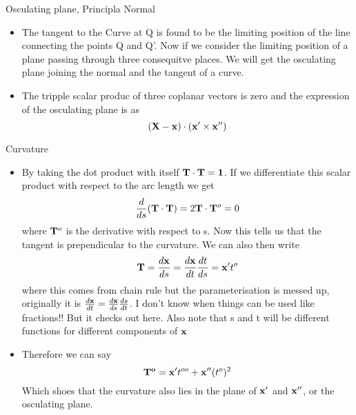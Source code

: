 	\begin{frame}{Osculating plane, Principla Normal}
		\begin{itemize}
			\item The tangent to the Curve at Q is found to be the limiting position of the line connecting the points Q and Q'. Now if we consider the limiting position of a plane passing through three consequitve places. We will get the osculating plane joining the normal and the tangent of a curve.
			\item The tripple scalar produc of three coplanar vectors is zero and the expression of the osculating plane is as
			\begin{equation}
			\mathbf{(X-x)\cdot ({x}' \times {x}'')}
			\end{equation}
			
		\end{itemize}
	\end{frame}


	\begin{frame}{Curvature}
		\begin{itemize}
			\item By taking the dot product with itself $\mathbf{T \cdot T = 1}$. If we differentiate this scalar product with respect to the arc length we get 
			\begin{equation}
			\frac{d}{ds}(\mathbf{T\cdot T}) =  2 \mathbf{T \cdot T}^o = 0
			\end{equation}
			where $\mathbf{T}^o$ is the derivative with respect to s. Now this tells us that the tangent is prependicular to the curvature. We can also then write
			\begin{equation}
				\mathbf{T} = \frac{d\mathbf{x}}{ds} = \frac{d\mathbf{x}}{dt} \frac{dt}{ds} = \mathbf{x'}t^o 
			\end{equation} 
			where this comes from chain rule but the parameterisation is messed up, originally it is $\frac{d\mathbf{x}}{dt} = \frac{d\mathbf{x}}{ds}\frac{ds}{dt} $. I don't know when things can be used like fractions!! But it checks out here. Also note that s and t will be different functions for different components of $\mathbf{x}$
			\item Therefore we can say 
			\begin{equation}
			\mathbf{T^o = x'}t^{oo} + \mathbf{x''}(t^o)^2
			\end{equation}
			Which shoes that the curvature also lies in the plane of $\mathbf{x'}$ and $\mathbf{x''}$, or the osculating plane.
		\end{itemize}
	\end{frame}


